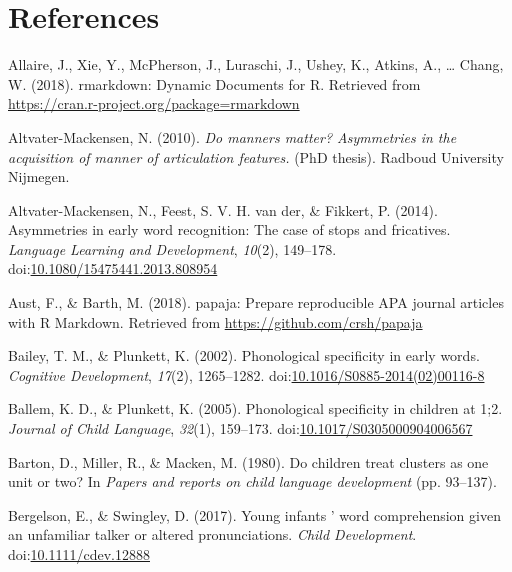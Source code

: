 \documentclass[man]{apa6}
\theoremstyle{definition}
\theoremstyle{definition}
\theoremstyle{definition}
\theoremstyle{remark}
\begin{document}
\newpage

\section{References}\label{references}

\begingroup
\setlength{\parindent}{-0.5in} \setlength{\leftskip}{0.5in}

\hypertarget{refs}{}
\hypertarget{ref-RMarkdown}{}
Allaire, J., Xie, Y., McPherson, J., Luraschi, J., Ushey, K., Atkins,
A., \ldots{} Chang, W. (2018). rmarkdown: Dynamic Documents for R.
Retrieved from \url{https://cran.r-project.org/package=rmarkdown}

\hypertarget{ref-Altvater2010}{}
Altvater-Mackensen, N. (2010). \emph{Do manners matter? Asymmetries in
the acquisition of manner of articulation features.} (PhD thesis).
Radboud University Nijmegen.

\hypertarget{ref-Altvater2014}{}
Altvater-Mackensen, N., Feest, S. V. H. van der, \& Fikkert, P. (2014).
Asymmetries in early word recognition: The case of stops and fricatives.
\emph{Language Learning and Development}, \emph{10}(2), 149--178.
doi:\href{https://doi.org/10.1080/15475441.2013.808954}{10.1080/15475441.2013.808954}

\hypertarget{ref-papaja}{}
Aust, F., \& Barth, M. (2018). papaja: Prepare reproducible APA journal
articles with R Markdown. Retrieved from
\url{https://github.com/crsh/papaja}

\hypertarget{ref-Bailey2002}{}
Bailey, T. M., \& Plunkett, K. (2002). Phonological specificity in early
words. \emph{Cognitive Development}, \emph{17}(2), 1265--1282.
doi:\href{https://doi.org/10.1016/S0885-2014(02)00116-8}{10.1016/S0885-2014(02)00116-8}

\hypertarget{ref-Ballem2005}{}
Ballem, K. D., \& Plunkett, K. (2005). Phonological specificity in
children at 1;2. \emph{Journal of Child Language}, \emph{32}(1),
159--173.
doi:\href{https://doi.org/10.1017/S0305000904006567}{10.1017/S0305000904006567}

\hypertarget{ref-Barton1980}{}
Barton, D., Miller, R., \& Macken, M. (1980). Do children treat clusters
as one unit or two? In \emph{Papers and reports on child language
development} (pp. 93--137).

\hypertarget{ref-Bergelson2017}{}
Bergelson, E., \& Swingley, D. (2017). Young infants ' word
comprehension given an unfamiliar talker or altered pronunciations.
\emph{Child Development}.
doi:\href{https://doi.org/10.1111/cdev.12888}{10.1111/cdev.12888}
\end{document}
